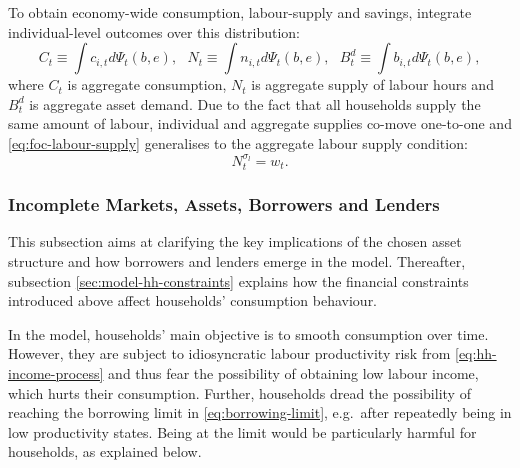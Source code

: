 \documentclass[a4paper,12pt]{article} %
\numberwithin{equation}{section} %
\numberwithin{figure}{section}
\numberwithin{table}{section}
\begin{document}
To obtain economy-wide consumption, labour-supply and savings, integrate individual-level outcomes over this distribution:
\begin{equation*}
    C_t \equiv \int c_{i,t} d \Psi_t (b,e), \ \ \ N_t \equiv \int n_{i,t} d \Psi_t (b,e), \ \ \ B_t^d \equiv \int b_{i,t} d \Psi_t (b,e), %
\end{equation*}
where $C_t$ is aggregate consumption, $N_t$ is aggregate supply of labour hours and $B_t^d$ is aggregate asset demand. Due to the fact that all households supply the same amount of labour, individual and aggregate supplies co-move one-to-one and \eqref{eq:foc-labour-supply} generalises to the aggregate labour supply condition:
\begin{equation}
    N_t^{\sigma_l} = w_t. \label{eq:hh-agg-labour-supply}
\end{equation}

\subsubsection{Incomplete Markets, Assets, Borrowers and Lenders}
\label{sec:model-hh-assets}

This subsection aims at clarifying the key implications of the chosen asset structure and how borrowers and lenders emerge in the model. Thereafter, subsection \ref{sec:model-hh-constraints} explains how the financial constraints introduced above affect households' consumption behaviour.  

In the model, households' main objective is to smooth consumption over time. However, they are subject to idiosyncratic labour productivity risk from \eqref{eq:hh-income-process} and thus fear the possibility of obtaining low labour income, which hurts their consumption. Further, households dread the possibility of reaching the borrowing limit in \eqref{eq:borrowing-limit}, e.g.~after repeatedly being in low productivity states. Being at the limit would be particularly harmful for households, as explained below.

\end{document}
